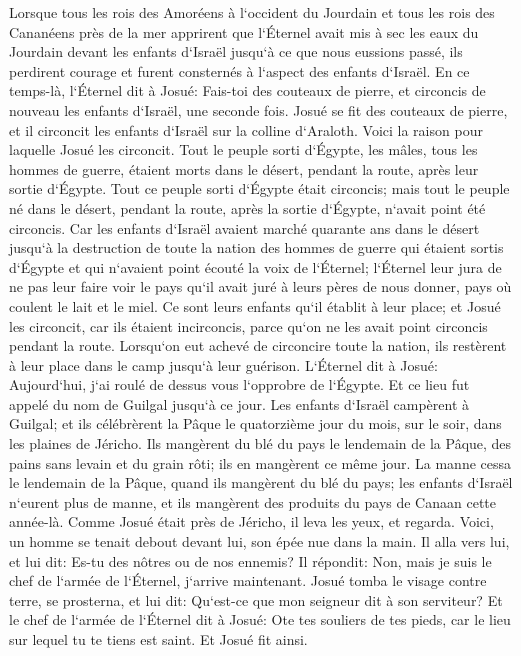 \verse Lorsque tous les rois des Amoréens à l`occident du Jourdain et tous les rois des Cananéens près de la mer apprirent que l`Éternel avait mis à sec les eaux du Jourdain devant les enfants d`Israël jusqu`à ce que nous eussions passé, ils perdirent courage et furent consternés à l`aspect des enfants d`Israël. 
\verse En ce temps-là, l`Éternel dit à Josué: Fais-toi des couteaux de pierre, et circoncis de nouveau les enfants d`Israël, une seconde fois. 
\verse Josué se fit des couteaux de pierre, et il circoncit les enfants d`Israël sur la colline d`Araloth. 
\verse Voici la raison pour laquelle Josué les circoncit. Tout le peuple sorti d`Égypte, les mâles, tous les hommes de guerre, étaient morts dans le désert, pendant la route, après leur sortie d`Égypte. 
\verse Tout ce peuple sorti d`Égypte était circoncis; mais tout le peuple né dans le désert, pendant la route, après la sortie d`Égypte, n`avait point été circoncis. 
\verse Car les enfants d`Israël avaient marché quarante ans dans le désert jusqu`à la destruction de toute la nation des hommes de guerre qui étaient sortis d`Égypte et qui n`avaient point écouté la voix de l`Éternel; l`Éternel leur jura de ne pas leur faire voir le pays qu`il avait juré à leurs pères de nous donner, pays où coulent le lait et le miel. 
\verse Ce sont leurs enfants qu`il établit à leur place; et Josué les circoncit, car ils étaient incirconcis, parce qu`on ne les avait point circoncis pendant la route. 
\verse Lorsqu`on eut achevé de circoncire toute la nation, ils restèrent à leur place dans le camp jusqu`à leur guérison. 
\verse L`Éternel dit à Josué: Aujourd`hui, j`ai roulé de dessus vous l`opprobre de l`Égypte. Et ce lieu fut appelé du nom de Guilgal jusqu`à ce jour. 
\verse Les enfants d`Israël campèrent à Guilgal; et ils célébrèrent la Pâque le quatorzième jour du mois, sur le soir, dans les plaines de Jéricho. 
\verse Ils mangèrent du blé du pays le lendemain de la Pâque, des pains sans levain et du grain rôti; ils en mangèrent ce même jour. 
\verse La manne cessa le lendemain de la Pâque, quand ils mangèrent du blé du pays; les enfants d`Israël n`eurent plus de manne, et ils mangèrent des produits du pays de Canaan cette année-là. 
\verse Comme Josué était près de Jéricho, il leva les yeux, et regarda. Voici, un homme se tenait debout devant lui, son épée nue dans la main. Il alla vers lui, et lui dit: Es-tu des nôtres ou de nos ennemis? 
\verse Il répondit: Non, mais je suis le chef de l`armée de l`Éternel, j`arrive maintenant. Josué tomba le visage contre terre, se prosterna, et lui dit: Qu`est-ce que mon seigneur dit à son serviteur? 
\verse Et le chef de l`armée de l`Éternel dit à Josué: Ote tes souliers de tes pieds, car le lieu sur lequel tu te tiens est saint. Et Josué fit ainsi. 

